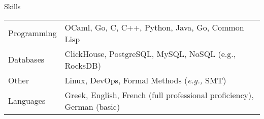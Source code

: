 \documentclass[11pt]{resume}
\begin{document}
\begin{rSection}{Skills}

  \begin{tabular}{ll}
    Programming & OCaml, Go, C, C++, Python, Java, Go, Common Lisp \\

    Databases & ClickHouse, PostgreSQL, MySQL, NoSQL (e.g., RocksDB) \\

    Other & Linux, DevOps, Formal Methods (\emph{e.g.,} SMT) \\

    Languages & Greek, English, French (full professional
    proficiency), German (basic)
  \end{tabular}

\end{rSection}
\end{document}
